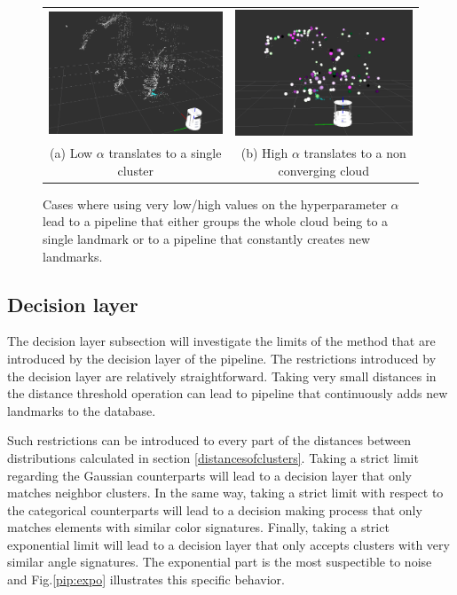 \documentclass[twoside,hidelinks]{article}
\begin{document}
\begin{figure}
\begin{tabular}{cc}
    \includegraphics[width=.5\textwidth]{singlecluster} &  \includegraphics[width=.5\textwidth]{onlyclusters2} \\
  (a) Low $\alpha$ translates to a single cluster  & (b) High $\alpha$ translates to a non converging cloud \\[6pt]
\end{tabular}
\caption{Cases where using very low/high values on the hyperparameter $\alpha$ lead to a pipeline that either groups the whole cloud being to a single landmark or to a pipeline that constantly creates new landmarks.}
  \label{pip:limits}
\end{figure}

\subsection{Decision layer}


The decision layer subsection will investigate the limits of the method that are introduced by the decision layer of the pipeline.
The restrictions introduced by the decision layer are relatively straightforward. Taking very small distances in the distance threshold operation can lead to pipeline that continuously adds new landmarks to the database. 

Such restrictions can be introduced to every part of the distances between distributions calculated in section \ref{distancesofclusters}. Taking a strict limit regarding the Gaussian counterparts will lead to a decision layer that only matches neighbor clusters. In the same way, taking a strict limit with respect to the categorical counterparts will lead to a decision making process that only matches elements with similar color signatures. Finally, taking a strict exponential limit will lead to a decision layer that only accepts clusters with very similar angle signatures.
The exponential part is the most suspectible to noise and Fig.\ref{pip:expo} illustrates this specific behavior.
\end{document}

